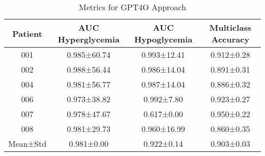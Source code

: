 \begin{table}[h!]
\centering
\caption{Metrics for GPT4O Approach}
\label{tab:metrics_GPT4O}
\renewcommand{\arraystretch}{1.2}
\begin{tabular}{|c|c|c|c|}
\hline
\rowcolor{gray!20} \textbf{Patient} & \textbf{AUC Hyperglycemia} & \textbf{AUC Hypoglycemia} & \textbf{Multiclass Accuracy} \\
\hline
001 & 0.985±60.74 & 0.993±12.41 & 0.912±0.28 \\
\hline
002 & 0.988±56.44 & 0.986±14.04 & 0.891±0.31 \\
\hline
004 & 0.981±56.77 & 0.987±14.04 & 0.886±0.32 \\
\hline
006 & 0.973±38.82 & 0.992±7.80 & 0.923±0.27 \\
\hline
007 & 0.978±47.67 & 0.617±0.00 & 0.950±0.22 \\
\hline
008 & 0.981±29.73 & 0.960±16.99 & 0.860±0.35 \\
\hline
Mean±Std & 0.981±0.00 & 0.922±0.14 & 0.903±0.03 \\
\hline
\end{tabular}
\end{table}